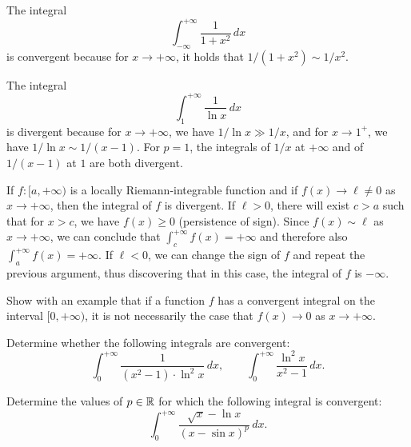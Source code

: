 \begin{example}
The integral
\[
  \int_{-\infty}^{+\infty}\frac{1}{1+x^2}\, dx
\]
is convergent because for $x\to +\infty$, it holds that $1/(1+x^2) \sim 1/x^2$.

The integral
\[
  \int_1^{+\infty} \frac{1}{\ln x}\, dx
\]
is divergent because for $x\to +\infty$, we have $1/\ln x \gg 1/x$, and for
$x\to 1^+$, we have $1/\ln x \sim 1/(x-1)$. For $p=1$, the integrals of $1/x$ at
$+\infty$ and of $1/(x-1)$ at $1$ are both divergent.

If $f\colon [a,+\infty)$ is a locally Riemann-integrable function and if
$f(x)\to \ell \neq 0$ as $x\to +\infty$, then the integral of $f$ is divergent.
If $\ell>0$, there will exist $c>a$ such that for $x>c$, we have $f(x)\ge 0$
(persistence of sign). Since $f(x)\sim \ell$ as $x\to +\infty$, we can conclude
that $\int_c^{+\infty} f(x) = +\infty$ and therefore also $\int_a^{+\infty} f(x)
= +\infty$. If $\ell<0$, we can change the sign of $f$ and repeat the previous
argument, thus discovering that in this case, the integral of $f$ is $-\infty$.
\end{example}

\begin{exercise}
Show with an example that if a function $f$ has a convergent integral on the
interval $[0,+\infty)$, it is not necessarily the case that $f(x)\to 0$ as $x\to
+\infty$.
\end{exercise}


\begin{exercise}
Determine whether the following integrals are convergent:
\[
  \int_0^{+\infty} \frac{1}{(x^2-1)\cdot \ln^2 x}\, dx, \qquad
  \int_0^{+\infty} \frac{\ln^2 x}{x^2-1}\, dx.  
\]
\end{exercise}

\begin{exercise}
Determine the values of $p\in {\mathbb R}$ for which the following integral is
convergent:
  \[
  \int_0^{+\infty} \frac{\sqrt x-\ln x}{(x-\sin x)^p}\, dx.  
  \]
\end{exercise}


